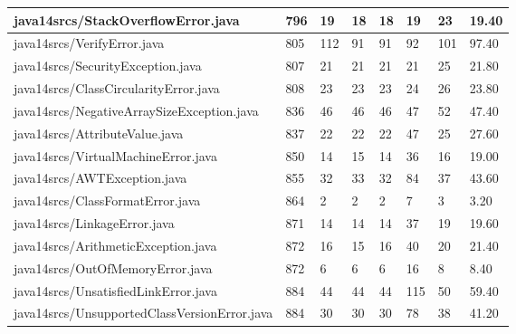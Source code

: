 \begin{tabular}{|l|l|l|l|l|l|l|l|}
\hline
java14srcs/StackOverflowError.java                 & 796         & 19        & 18        & 18        & 19        & 23        & 19.40     \\
\hline
java14srcs/VerifyError.java                        & 805         & 112       & 91        & 91        & 92        & 101       & 97.40     \\
\hline
java14srcs/SecurityException.java                  & 807         & 21        & 21        & 21        & 21        & 25        & 21.80     \\
\hline
java14srcs/ClassCircularityError.java              & 808         & 23        & 23        & 23        & 24        & 26        & 23.80     \\
\hline
java14srcs/NegativeArraySizeException.java         & 836         & 46        & 46        & 46        & 47        & 52        & 47.40     \\
\hline
java14srcs/AttributeValue.java                     & 837         & 22        & 22        & 22        & 47        & 25        & 27.60     \\
\hline
java14srcs/VirtualMachineError.java                & 850         & 14        & 15        & 14        & 36        & 16        & 19.00     \\
\hline
java14srcs/AWTException.java                       & 855         & 32        & 33        & 32        & 84        & 37        & 43.60     \\
\hline
java14srcs/ClassFormatError.java                   & 864         & 2         & 2         & 2         & 7         & 3         & 3.20      \\
\hline
java14srcs/LinkageError.java                       & 871         & 14        & 14        & 14        & 37        & 19        & 19.60     \\
\hline
java14srcs/ArithmeticException.java                & 872         & 16        & 15        & 16        & 40        & 20        & 21.40     \\
\hline
java14srcs/OutOfMemoryError.java                   & 872         & 6         & 6         & 6         & 16        & 8         & 8.40      \\
\hline
java14srcs/UnsatisfiedLinkError.java               & 884         & 44        & 44        & 44        & 115       & 50        & 59.40     \\
\hline
java14srcs/UnsupportedClassVersionError.java       & 884         & 30        & 30        & 30        & 78        & 38        & 41.20     \\

\end{tabular}
